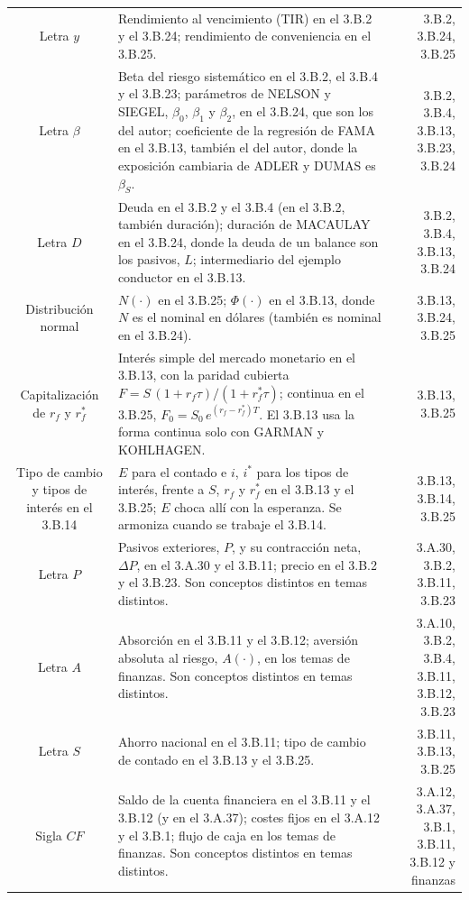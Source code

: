 \documentclass[10pt,a4paper]{article}
\begin{document}
\begin{longtable}{SMD}
Letra $y$ & Rendimiento al vencimiento (TIR) en el 3.B.2 y el 3.B.24; rendimiento de conveniencia en el 3.B.25. & 3.B.2, 3.B.24, 3.B.25\\
Letra $\beta$ & Beta del riesgo sistemático en el 3.B.2, el 3.B.4 y el 3.B.23; parámetros de NELSON y SIEGEL, $\beta_0$, $\beta_1$ y $\beta_2$, en el 3.B.24, que son los del autor; coeficiente de la regresión de FAMA en el 3.B.13, también el del autor, donde la exposición cambiaria de ADLER y DUMAS es $\beta_S$. & 3.B.2, 3.B.4, 3.B.13, 3.B.23, 3.B.24\\
Letra $D$ & Deuda en el 3.B.2 y el 3.B.4 (en el 3.B.2, también duración); duración de MACAULAY en el 3.B.24, donde la deuda de un balance son los pasivos, $L$; intermediario del ejemplo conductor en el 3.B.13. & 3.B.2, 3.B.4, 3.B.13, 3.B.24\\
Distribución normal & $N(\cdot)$ en el 3.B.25; $\Phi(\cdot)$ en el 3.B.13, donde $N$ es el nominal en dólares (también es nominal en el 3.B.24). & 3.B.13, 3.B.24, 3.B.25\\
Capitalización de $r_f$ y $r_f^*$ & Interés simple del mercado monetario en el 3.B.13, con la paridad cubierta $F=S\,(1+r_f\tau)/(1+r_f^*\tau)$; continua en el 3.B.25, $F_0=S_0\,e^{(r_f-r_f^*)T}$. El 3.B.13 usa la forma continua solo con GARMAN y KOHLHAGEN. & 3.B.13, 3.B.25\\
Tipo de cambio y tipos de interés en el 3.B.14 & $E$ para el contado e $i$, $i^*$ para los tipos de interés, frente a $S$, $r_f$ y $r_f^*$ en el 3.B.13 y el 3.B.25; $E$ choca allí con la esperanza. Se armoniza cuando se trabaje el 3.B.14. & 3.B.13, 3.B.14, 3.B.25\\
Letra $P$ & Pasivos exteriores, $P$, y su contracción neta, $\Delta P$, en el 3.A.30 y el 3.B.11; precio en el 3.B.2 y el 3.B.23. Son conceptos distintos en temas distintos. & 3.A.30, 3.B.2, 3.B.11, 3.B.23\\
Letra $A$ & Absorción en el 3.B.11 y el 3.B.12; aversión absoluta al riesgo, $A(\cdot)$, en los temas de finanzas. Son conceptos distintos en temas distintos. & 3.A.10, 3.B.2, 3.B.4, 3.B.11, 3.B.12, 3.B.23\\
Letra $S$ & Ahorro nacional en el 3.B.11; tipo de cambio de contado en el 3.B.13 y el 3.B.25. & 3.B.11, 3.B.13, 3.B.25\\
Sigla $CF$ & Saldo de la cuenta financiera en el 3.B.11 y el 3.B.12 (y en el 3.A.37); costes fijos en el 3.A.12 y el 3.B.1; flujo de caja en los temas de finanzas. Son conceptos distintos en temas distintos. & 3.A.12, 3.A.37, 3.B.1, 3.B.11, 3.B.12 y finanzas\\

\end{longtable}
\end{document}
